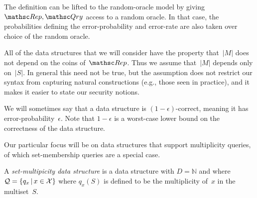 \noindent
The definition can be lifted to the random-oracle model
by giving $\Rep, \Qry$ access to a random oracle. In that case,
the probabilities defining the error-probability and error-rate are also taken over choice of the random oracle.

All of the data structures that we will consider have the property that~$|M|$ does not depend on the coins of~$\Rep$. Thus we assume that~$|M|$ depends only on~$|S|$.  In general this need not be true, but the assumption does not restrict our syntax from capturing natural constructions (e.g., those seen in practice), and it makes it easier to state our security notions.

We will sometimes say that a data structure is $(1-\epsilon)$-correct, meaning it has error-probability~$\epsilon$.  Note that $1-\epsilon$ is a worst-case lower bound on the correctness of the data structure.


Our particular focus will be on data structures that support multiplicity queries, of which set-membership queries are a special case.  
\begin{definition} A \emph{set-multipicity data structure} is a data structure with $D=\mathbb{N}$ and where ${\cal Q}=\{q_x \,|\, x \in {\cal X}\}$ where $q_x(S)$ is defined to be the multiplicity of~$x$ in the multiset~$S$.
\end{definition}
%


